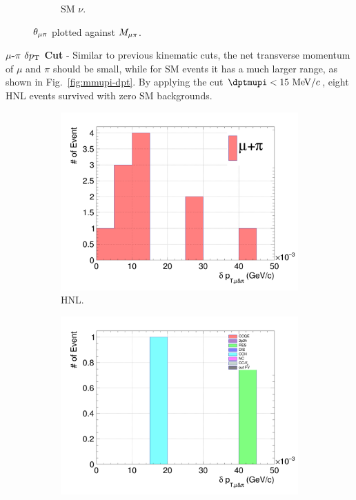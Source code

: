 \begin{figure}[!htb]
\begin{subfigure}{0.45\textwidth}
                \caption{SM $\nu$.}
                \label{fig:sm-mmupi}
           \end{subfigure}
           \caption{$\theta_{\mu\pi}$ plotted against $M_{\mu\pi}$.}
           \label{fig:mmupi-mupiang}
        \end{figure}

        \textbf{$\mu$-$\pi$ $\delta p_\textrm{T}$ Cut} - Similar to previous kinematic cuts, the net transverse momentum of $\mu$ and $\pi$ should be small, while for SM events it has a much larger range, as shown in Fig.~\ref{fig:mmupi-dpt}. By applying the cut $\dptmupi<15~\mevc$, eight HNL events survived with zero SM backgrounds.

        \begin{figure}[!htb]
           \centering
           \begin{subfigure}{0.45\textwidth}
                \includegraphics[width=\textwidth]{figures/hnl_sfgmu_mpdpt_stack_al9_300_aftmupikin.png}
                \caption{HNL.}
                \label{fig:hnl-mupidpt}
           \end{subfigure}
           \begin{subfigure}{0.45\textwidth}
                \includegraphics[width=\textwidth]{figures/hnl_sfgmu_mpdpt_stack_al9_SM_aftmupikin.png}

\end{subfigure}
\end{figure}
